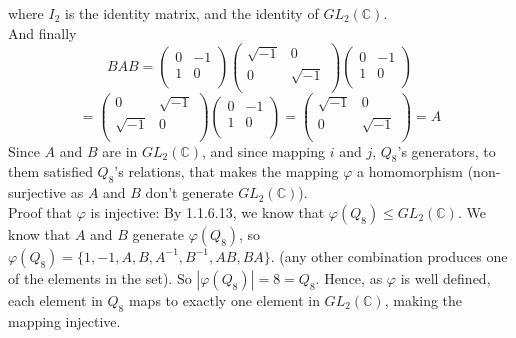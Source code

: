 \documentclass[12pt]{article}
\newcommand{\C}{\mathbb{C}}
\begin{document}
    where $I_2$ is the identity matrix,
    and the identity of $GL_2(\C)$. \\
    And finally
    \[  BAB = \begin{pmatrix}
        0 & -1 \\
        1 & 0 \\
    \end{pmatrix}
    \begin{pmatrix}
        \sqrt{-1} & 0 \\
        0 & \sqrt{-1} \\
    \end{pmatrix}
    \begin{pmatrix}
        0 & -1 \\
        1 & 0 \\
    \end{pmatrix} \]
    \[ = \begin{pmatrix}
        0 & \sqrt{-1} \\
        \sqrt{-1} & 0 \\
    \end{pmatrix}
    \begin{pmatrix}
        0 & -1 \\
        1 & 0 \\
    \end{pmatrix}
    = \begin{pmatrix}
        \sqrt{-1} & 0 \\
        0 & \sqrt{-1} \\
    \end{pmatrix} = A \]
    Since $A$ and $B$ are in $GL_2(\C)$,
    and since mapping $i$ and $j$, $Q_8$'s generators, to them
    satisfied $Q_8$'s relations,
    that makes the mapping $\varphi$ a homomorphism
    (non-surjective as $A$ and $B$ don't generate $GL_2(\C)$). \\
    Proof that $\varphi$ is injective:
    By 1.1.6.13, we know that $\varphi(Q_8) \leqslant GL_2(\C)$.
    We know that $A$ and $B$ generate $\varphi(Q_8)$,
    so $\varphi(Q_8) = \{ 1, -1, A, B, A^{-1}, B^{-1}, AB, BA \}$.
    (any other combination produces one of the elements in the set).
    So $|\varphi(Q_8)| = 8 = Q_8$.
    Hence, as $\varphi$ is well defined, each element in $Q_8$
    maps to exactly one element in $GL_2(\C)$,
    making the mapping injective.
        
\end{document}
